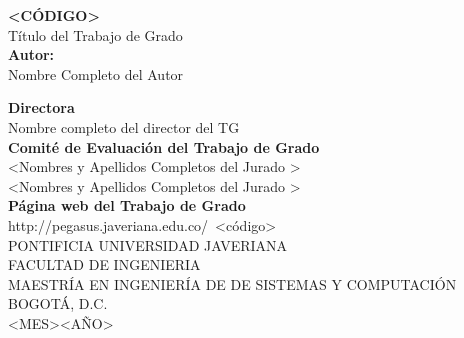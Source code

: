 \thispagestyle{empty}

\begin{center}

		\fontsize{12pt}{12pt}\textbf{<CÓDIGO>}\\
		\fontsize{14pt}{14pt}\selectfont Título del Trabajo de Grado\\ %
		\vspace*{3cm}
		\fontsize{12pt}{12pt}\textbf{Autor:}\\ 
		\vspace{0.2cm}
		\fontsize{14pt}{14pt}Nombre Completo del Autor\\
        \vspace*{4cm}

        \vspace*{1.7cm}
		\fontsize{12pt}{12pt}\textbf{Directora}\\
		\vspace{0.2cm}
        Nombre completo del director del TG\\
        \vspace{0.2cm}
        \textbf{Comité de Evaluación del Trabajo de Grado}\\
        \vspace{0.2cm}
        <Nombres y Apellidos Completos del Jurado >\\
        \vspace{0.2cm}
        <Nombres y Apellidos Completos del Jurado >\\
        \vspace{0.2cm}
        \textbf{Página web del Trabajo de Grado}\\
        \vspace{0.2cm}
        http://pegasus.javeriana.edu.co/~<código>\\

		\vspace*{1.8cm}
		\fontsize{12pt}{12pt}\selectfont PONTIFICIA UNIVERSIDAD JAVERIANA\\
		FACULTAD DE INGENIERIA\\
		MAESTRÍA EN INGENIERÍA DE DE SISTEMAS Y COMPUTACIÓN\\
		BOGOTÁ, D.C.\\
		<MES><AÑO> %
\end{center}